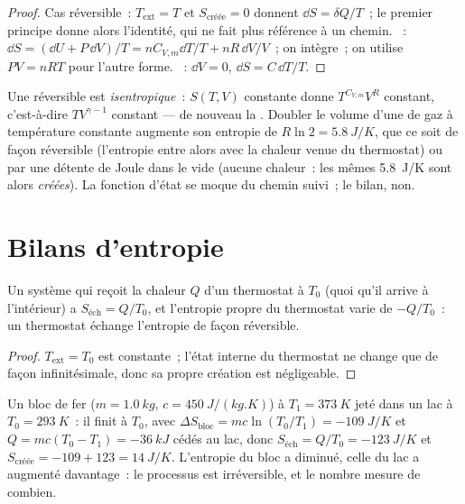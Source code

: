 \begin{proof}
Cas réversible~: $T_{\mathrm{ext}} = T$ et $S_{\text{créée}} = 0$ donnent $\dd S =
\delta Q/T$~; le premier principe donne alors l'identité, qui ne fait plus
référence à un chemin. ~: $\dd S = (\dd U + P\,\dd V)/T = nC_{V,m}\dd T/T
+ nR\,\dd V/V$~; on intègre~; on utilise $PV = nRT$ pour l'autre forme. ~: $\dd V = 0$, $\dd S = C\,\dd T/T$.
\end{proof}

\begin{example}\label{ex:b1:second-law-entropy:formulas}
Une  réversible est \emph{isentropique}~: $S(T, V)$
constante donne $T^{C_{V,m}}V^R$ constant, c'est-à-dire $TV^{\gamma - 1}$ constant ---
de nouveau la . Doubler le volume d'une  de gaz à
température constante augmente son entropie de $R\ln2 = \qty{5.8}{J/K}$, que
ce soit de façon réversible (l'entropie entre alors avec la chaleur venue du
thermostat) ou par une détente de Joule dans le vide (aucune chaleur~: les
mêmes \qty{5.8}{J/K} sont alors \emph{créées}). La fonction d'état se moque
du chemin suivi~; le bilan, non.
\end{example}

\section{Bilans d'entropie}

\begin{proposition}\label{prop:b1:second-law-entropy:thermostat}
Un système qui reçoit la chaleur $Q$ d'un thermostat à $T_0$ (quoi qu'il
arrive à l'intérieur) a $S_{\text{éch}} = Q/T_0$, et l'entropie propre du
thermostat varie de $-Q/T_0$~: un thermostat échange l'entropie de façon réversible.
\end{proposition}

\begin{proof}
$T_{\mathrm{ext}} = T_0$ est constante~; l'état interne du thermostat ne
change que de façon infinitésimale, donc sa propre création est négligeable.
\end{proof}

\begin{example}\label{ex:b1:second-law-entropy:quench}
Un bloc de fer ($m = \qty{1.0}{kg}$, $c = \qty{450}{J/(kg.K)}$) à $T_1 =
\qty{373}{K}$ jeté dans un lac à $T_0 = \qty{293}{K}$~: il finit à $T_0$,
avec $\Delta S_{\text{bloc}} = mc\ln(T_0/T_1) = \qty{-109}{J/K}$ et $Q =
mc(T_0 - T_1) = \qty{-36}{kJ}$ cédés au lac, donc $S_{\text{éch}} =
Q/T_0 = \qty{-123}{J/K}$ et $S_{\text{créée}} = -109 + 123 = \qty{+14}{J/K}$.
L'entropie du bloc a diminué, celle du lac a augmenté davantage~: le
processus est irréversible, et le nombre mesure de combien.
\end{example}

